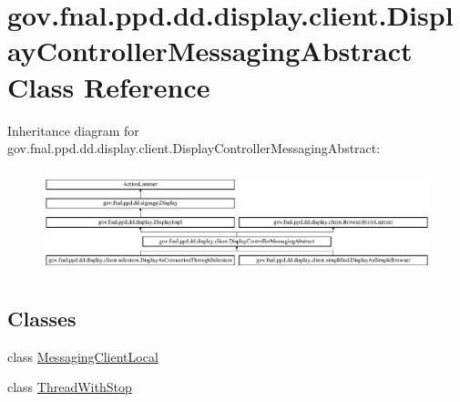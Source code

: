 \hypertarget{classgov_1_1fnal_1_1ppd_1_1dd_1_1display_1_1client_1_1DisplayControllerMessagingAbstract}{\section{gov.\-fnal.\-ppd.\-dd.\-display.\-client.\-Display\-Controller\-Messaging\-Abstract Class Reference}
\label{classgov_1_1fnal_1_1ppd_1_1dd_1_1display_1_1client_1_1DisplayControllerMessagingAbstract}
}
Inheritance diagram for gov.\-fnal.\-ppd.\-dd.\-display.\-client.\-Display\-Controller\-Messaging\-Abstract\-:\begin{figure}[H]
\begin{center}
\leavevmode
\includegraphics[height=3.023758cm]{classgov_1_1fnal_1_1ppd_1_1dd_1_1display_1_1client_1_1DisplayControllerMessagingAbstract}
\end{center}
\end{figure}
\subsection*{Classes}
\begin{DoxyCompactItemize}
\item 
class \hyperlink{classgov_1_1fnal_1_1ppd_1_1dd_1_1display_1_1client_1_1DisplayControllerMessagingAbstract_1_1MessagingClientLocal}{Messaging\-Client\-Local}
\item 
class \hyperlink{classgov_1_1fnal_1_1ppd_1_1dd_1_1display_1_1client_1_1DisplayControllerMessagingAbstract_1_1ThreadWithStop}{Thread\-With\-Stop}
\end{DoxyCompactItemize}

